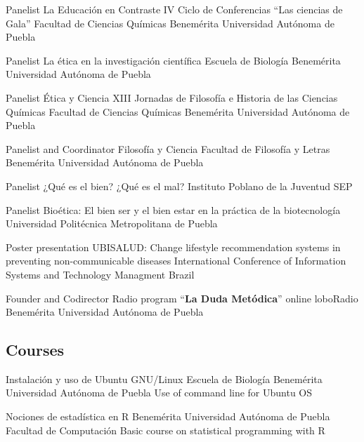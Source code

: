 \documentclass[10pt, letterpaper, roman]{moderncv}
\begin{document}
		{Panelist}
		{La Educación en Contraste}
		{IV Ciclo de Conferencias ``Las ciencias de Gala''}
		{\newline Facultad de Ciencias Químicas}
		{Benemérita Universidad Autónoma de Puebla}

		{Panelist}
		{La ética en la investigación científica}
		{}
		{\newline Escuela de Biología}
		{Benemérita Universidad Autónoma de Puebla}

		{Panelist}
		{Ética y Ciencia}
		{XIII Jornadas de Filosofía e Historia de las Ciencias Químicas}
		{\newline Facultad de Ciencias Químicas}
		{Benemérita Universidad Autónoma de Puebla}

		{Panelist and Coordinator}
		{Filosofía y Ciencia}
		{}
		{\newline Facultad de Filosofía y Letras}
		{Benemérita Universidad Autónoma de Puebla}

		{Panelist}
		{¿Qué es el bien? ¿Qué es el mal?}
		{}
		{\newline Instituto Poblano de la Juventud}
		{SEP}

		{Panelist}
		{Bioética: El bien ser y el bien estar en la práctica de la 
		biotecnología}
		{}
		{}
		{Universidad Politécnica Metropolitana de Puebla}

		{Poster presentation}
		{UBISALUD: Change lifestyle recommendation systems in preventing 
		non-communicable diseases}
		{International Conference of Information Systems and Technology 
		Managment}
		{}
		{Brazil}

		{Founder and Codirector}
		{Radio program ``\textbf{La Duda Metódica}'' online}
		{}
		{\newline loboRadio}
		{Benemérita Universidad Autónoma de Puebla}
		
\subsection{Courses}

		{Instalación y uso de Ubuntu GNU/Linux}
		{}
		{Escuela de Biología}
		{Benemérita Universidad Autónoma de Puebla}
		{Use of command line for Ubuntu OS}

		{Nociones de estadística en R}
		{}
		{Benemérita Universidad Autónoma de Puebla}
		{Facultad de Computación}
		{Basic course on statistical programming with R}
\end{document}
